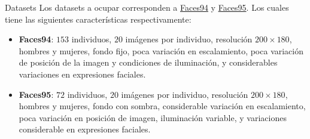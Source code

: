 \documentclass{beamer}
\begin{document}
\begin{frame}{Datasets}
Los datasets a ocupar corresponden a \href{http://cswww.essex.ac.uk/mv/allfaces/faces94.html}{Faces94} y
\href{http://cswww.essex.ac.uk/mv/allfaces/faces95.html}{Faces95}. Los cuales tiene las siguientes características 
respectivamente:
\begin{itemize}
	\item \textbf{Faces94}: $153$ individuos, $20$ imágenes por individuo, resolución $200\times 180$, hombres y mujeres, fondo fijo, poca variación en escalamiento, poca variación de posición de la imagen y condiciones de iluminación, y considerables variaciones en expresiones faciales.
	\item \textbf{Faces95}: $72$ individuos, $20$ imágenes por individuo, resolución $200\times 180$, hombres y mujeres, fondo con sombra, considerable variación en escalamiento, poca variación en posición de imagen, iluminación variable, y variaciones considerable en expresiones faciales.
\end{itemize}
\end{frame}
\end{document}
